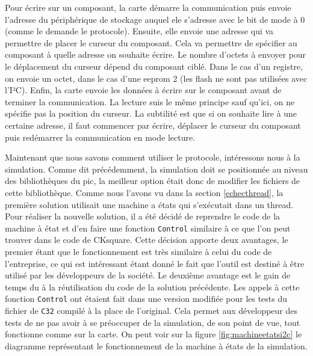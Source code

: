 \documentclass[a4paper]{article}
\begin{document}
Pour écrire sur un composant, la carte démarre la communication puis envoie
l'adresse du périphérique de stockage auquel ele s'adresse avec le bit de mode à
0 (comme le demande le protocole). Ensuite, elle envoie une adresse qui va
permettre de placer le curseur du composant. Cela va permettre de spécifier au
composant à quelle adresse on souhaite écrire. Le nombre d'octets à envoyer pour
le déplacement du curseur dépend du composant ciblé. Dans le cas d'un registre,
on envoie un octet, dans le cas d'une eeprom 2 (les flash ne sont pas utilisées
avec l'I²C). Enfin, la carte envoie les données à écrire sur le composant avant
de terminer la communication. La lecture suis le même principe sauf qu'ici, on
ne spécifie pas la position du curseur. La subtilité est que si on souhaite lire
à une certaine adresse, il faut commencer par écrire, déplacer le curseur du
composant puis redémarrer la communication en mode lecture.

Maintenant que nous savons comment utiliser le protocole, intéressons nous à la
simulation. Comme dit précédemment, la simulation doit se positionnée au niveau
des bibliothèques du \gls{pic}, la meilleur option était donc de modifier les
fichiers de cette bibliothèque. Comme nous l'avons vu dans la section
\ref{echecthread}, la première solution utilisait une machine a états qui
s'exécutait dans un thread. Pour réaliser la nouvelle solution, il a été décidé
de reprendre le code de la machine à état et d'en faire une fonction
\verb|Control| similaire à ce que l'on peut trouver dans le code de
CKsquare. Cette décision apporte deux avantages, le premier étant que le
fonctionnement est très similaire à celui du code de l'entreprise, ce qui est
intéressant étant donné le fait que l'outil est destiné à être utilisé par les
développeurs de la société. Le deuxième avantage est le gain de temps du à la
réutilisation du code de la solution précédente. Les appels à cette fonction
\verb|Control| ont étaient fait dans une version modifiée pour les tests du
fichier de \verb|C32| compilé à la place de l'original. Cela permet aux
développeur des tests de ne pas avoir à se préoccuper de la simulation, de son
point de vue, tout fonctionne comme sur la carte. On peut voir sur la figure
\ref{fig:machineetatsi2c} le diagramme représentant le fonctionnement de la
machine à états de la simulation.
\end{document}
